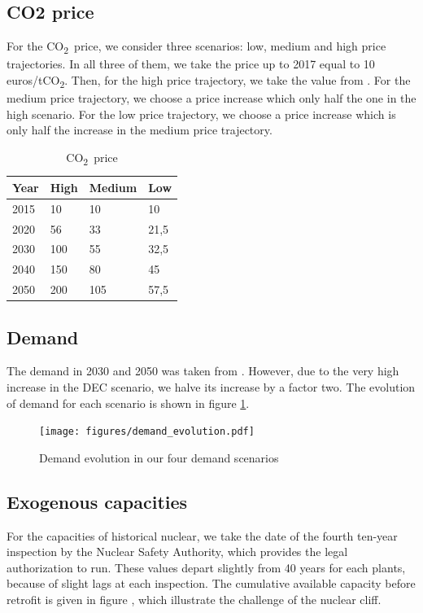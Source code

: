 \documentclass[authoryear]{elsarticle}
\newcommand\coo{CO\textsubscript{2}}
\begin{document}
\subsection{CO2 price}

For the \coo\ price, we consider three scenarios: low, medium and high price trajectories. In all three of them, we take the price up to 2017 equal to 10 euros/t\coo.
Then, for the high price trajectory, we take the value from \citet{Quinet2015}.
For the medium price trajectory, we choose a price increase which only half the one in the high scenario. For the low price trajectory, we choose a price increase which is only half the increase in the medium price trajectory.

\begin{table}
	\centering
	\caption{\coo\ price}
\label{tab:CO2_price}
	\begin{tabular}{llll}
		\toprule
		Year & High & Medium & Low \\
		\midrule
		2015 & 10 & 10 & 10 \\
		2020 & 56 & 33 & 21,5 \\
		2030 & 100 & 55 & 32,5 \\
		2040 & 150 & 80 & 45 \\
		2050 & 200 & 105 & 57,5 \\
		\bottomrule
	\end{tabular}
\end{table}



\subsection{Demand}

The demand in 2030 and 2050 was taken from \citet{Grandjean2014}. However, due to the very high increase in the DEC scenario, we halve its increase by a factor two. The evolution of demand for each scenario is shown in figure \ref{fig:demand_evolution}.

\begin{figure}[!ht]
	\centering
	\texttt{[image: figures/demand\_evolution.pdf]}
	\caption{Demand evolution in our four demand scenarios}
	\label{fig:demand_evolution}
\end{figure}

\subsection{Exogenous capacities}

For the capacities of historical nuclear, we take the date of the fourth ten-year inspection by the Nuclear Safety Authority, which provides the legal authorization to run. These values depart slightly from 40 years for each plants, because of slight lags at each inspection. 
The cumulative available capacity before retrofit is given in figure , which illustrate the challenge of the nuclear cliff.
\end{document}
